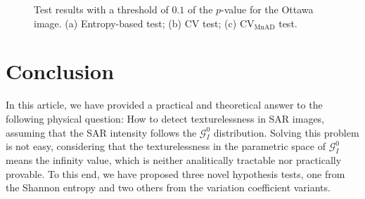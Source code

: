 \documentclass[remotesensing,article,submit,moreauthors,pdftex]{Definitions/mdpi}
\begin{document}
\begin{figure}[H]

{\centering {}

}

\caption{Test results with a threshold of $0.1$ of the $p$-value for the Ottawa image. (a) Entropy-based test; (b) CV test; (c) $\text{CV}_{\text{MnAD}}$ test.}\label{fig:sim_SAR_Images_01_Ottawa}
\end{figure}

\hypertarget{sec:conclusion}{%
\section{Conclusion}\label{sec:conclusion}}

In this article, we have provided a practical and theoretical answer to the following physical question: How to detect texturelessness in SAR images, assuming that the SAR intensity follows the $\mathcal{G}^0_I$ distribution.
Solving this problem is not easy, considering that the texturelessness in the parametric space of $\mathcal{G}^0_I$ means the infinity value, which is neither analitically tractable nor practically provable.
To this end, we have proposed three novel hypothesis tests, one from the Shannon entropy and two others from the variation coefficient variants.
\end{document}
